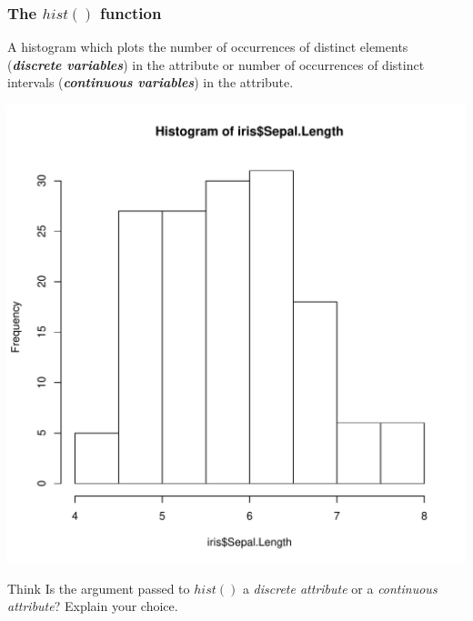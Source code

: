 \subsubsection{The $hist()$ function}
\noindent A histogram which plots the number of occurrences of distinct elements (\textbf{\emph{discrete variables}}) in the attribute or number of occurrences of distinct intervals (\textbf{\emph{continuous variables}}) in the attribute.
\begin{knitrout}
\color{fgcolor}\begin{kframe}
\begin{alltt}
\hlopt{$} 
\end{alltt}
\end{kframe}
\includegraphics[width=\maxwidth]{figure/hist-1} 
\begin{kframe}\begin{alltt}
\end{alltt}
\end{kframe}
\end{knitrout}

\begin{DIY}{Think}
Is the argument passed to $hist()$ a \emph{discrete attribute} or a \emph{continuous attribute}? Explain your choice.
\end{DIY}

